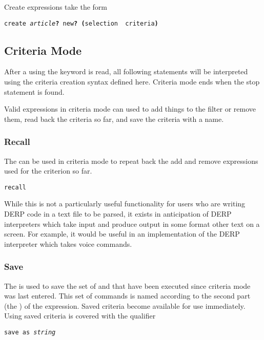Create expressions take the form
\begin{description}[labelindent=1cm,leftmargin=\onelen,labelwidth=1cm]
     \texttt{create \textit{article}\textbf{?} new\textbf{?} \textbf{(}selection \textbf{\textbar} criteria\textbf{)}}
\end{description}

\subsection{Criteria Mode}\label{Criteria_Mode}
After a  using the keyword  is read, all following statements will be interpreted using
the criteria creation syntax defined here. Criteria mode ends when the stop statement is found.

Valid expressions in criteria mode can used to add things to the filter or remove them, read back the criteria so
far, and save the criteria with a name.

\subsubsection{Recall}
The  can be used in criteria mode to repeat back the add and remove expressions used for the
criterion so far.
\begin{description}[labelindent=1cm,leftmargin=\onelen,labelwidth=1cm]
      \texttt{recall}
\end{description}
While this is not a particularly useful functionality for users who are writing DERP code in a text file to be
parsed, it exists in anticipation of DERP interpreters which take input and produce output in some format other
text on a screen. For example, it would be useful in an implementation of the DERP interpreter which takes voice
commands.


\subsubsection{Save}
The  is used to save the set of  and  that have been executed since
criteria mode was last entered. This set of commands is named according to the second part (the ) of the
expression. Saved criteria become available for use immediately. Using saved criteria is covered with the  qualifier
\begin{description}[labelindent=1cm,leftmargin=\onelen,labelwidth=1cm]
     \texttt{save as \textit{string}}
\end{description}

